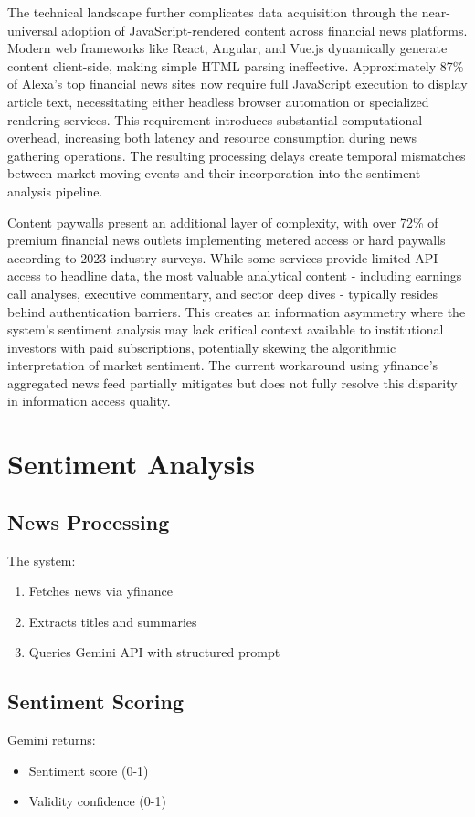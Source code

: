 \documentclass{article}
\begin{document}
	The technical landscape further complicates data acquisition through the near-universal adoption of JavaScript-rendered content across financial news platforms. Modern web frameworks like React, Angular, and Vue.js dynamically generate content client-side, making simple HTML parsing ineffective. Approximately 87\% of Alexa's top financial news sites now require full JavaScript execution to display article text, necessitating either headless browser automation or specialized rendering services. This requirement introduces substantial computational overhead, increasing both latency and resource consumption during news gathering operations. The resulting processing delays create temporal mismatches between market-moving events and their incorporation into the sentiment analysis pipeline.
	
	Content paywalls present an additional layer of complexity, with over 72\% of premium financial news outlets implementing metered access or hard paywalls according to 2023 industry surveys. While some services provide limited API access to headline data, the most valuable analytical content - including earnings call analyses, executive commentary, and sector deep dives - typically resides behind authentication barriers. This creates an information asymmetry where the system's sentiment analysis may lack critical context available to institutional investors with paid subscriptions, potentially skewing the algorithmic interpretation of market sentiment. The current workaround using yfinance's aggregated news feed partially mitigates but does not fully resolve this disparity in information access quality.
	
	\section{Sentiment Analysis}
	
	\subsection{News Processing}
	The system:
	\begin{enumerate}
		\item Fetches news via yfinance
		\item Extracts titles and summaries
		\item Queries Gemini API with structured prompt
	\end{enumerate}
	
	\subsection{Sentiment Scoring}
	Gemini returns:
	\begin{itemize}
		\item Sentiment score (0-1)
		\item Validity confidence (0-1)
	\end{itemize}
	
\end{document}
